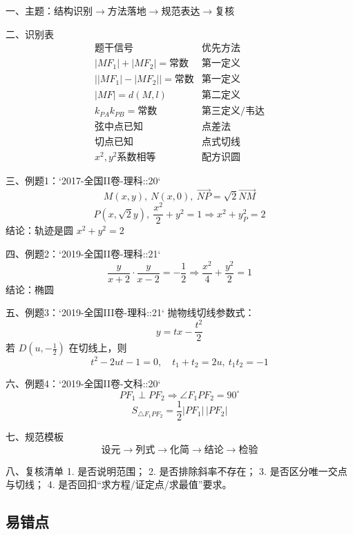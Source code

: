 \documentclass[UTF8,a4paper,11pt]{ctexart}
\begin{document}
一、主题：$\text{结构识别}\rightarrow\text{方法落地}\rightarrow\text{规范表达}\rightarrow\text{复核}$

二、识别表
\[
\begin{array}{c|c}
\text{题干信号} & \text{优先方法}\\
\hline
|MF_1|+|MF_2|=\text{常数} & \text{第一定义}\\
\bigl||MF_1|-|MF_2|\bigr|=\text{常数} & \text{第一定义}\\
|MF|=d(M,l) & \text{第二定义}\\
k_{PA}k_{PB}=\text{常数} & \text{第三定义/韦达}\\
\text{弦中点已知} & \text{点差法}\\
\text{切点已知} & \text{点式切线}\\
x^2,y^2\text{系数相等} & \text{配方识圆}
\end{array}
\]

三、例题1：`2017-全国II卷-理科::20`
\[
M(x,y),\ N(x,0),\ \overrightarrow{NP}=\sqrt{2}\overrightarrow{NM}
\]
\[
P(x,\sqrt{2}y),\ \frac{x^2}{2}+y^2=1\Rightarrow x^2+y_P^2=2
\]
结论：$\text{轨迹是圆 }x^2+y^2=2$

四、例题2：`2019-全国II卷-理科::21`
\[
\frac{y}{x+2}\cdot\frac{y}{x-2}=-\frac12
\Rightarrow \frac{x^2}{4}+\frac{y^2}{2}=1
\]
结论：$\text{椭圆}$

五、例题3：`2019-全国III卷-理科::21`
抛物线切线参数式：
\[
y=tx-\frac{t^2}{2}
\]
若 $D(u,-\frac12)$ 在切线上，则
\[
t^2-2ut-1=0,
\quad t_1+t_2=2u,\ t_1t_2=-1
\]

六、例题4：`2019-全国II卷-文科::20`
\[
PF_1\perp PF_2\Rightarrow \angle F_1PF_2=90^\circ
\]
\[
S_{\triangle F_1PF_2}=\frac12|PF_1|\,|PF_2|
\]

七、规范模板
\[
\text{设元}\to\text{列式}\to\text{化简}\to\text{结论}\to\text{检验}
\]

八、复核清单
1. 是否说明范围；
2. 是否排除斜率不存在；
3. 是否区分唯一交点与切线；
4. 是否回扣“求方程/证定点/求最值”要求。

\subsection*{易错点}
\end{document}
